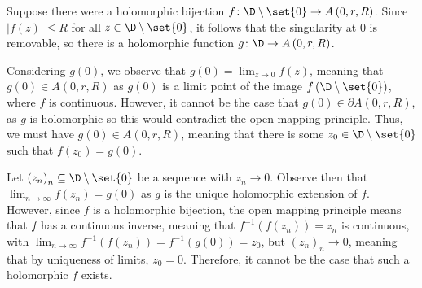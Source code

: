 \documentclass[11pt]{mypackage}
\begin{document}
\begin{solution}
  Suppose there were a holomorphic bijection $f\colon \D\setminus \set{0}\rightarrow A\left( 0,r,R \right)$. Since $\left\vert f(z) \right\vert \leq R$ for all $z\in \D\setminus \set{0}$, it follows that the singularity at $0$ is removable, so there is a holomorphic function $g\colon \D\rightarrow A\left( 0,r,R \right)$.\newline

  Considering $g(0)$, we observe that $g(0) = \lim_{z\rightarrow 0}f(z)$, meaning that $g(0)\in \overline{A}\left( 0,r,R \right)$ as $g(0)$ is a limit point of the image $f\left( \D\setminus \set{0} \right)$, where $f$ is continuous. However, it cannot be the case that $g(0)\in \partial A\left( 0,r,R \right)$, as $g$ is holomorphic so this would contradict the open mapping principle. Thus, we must have $g(0)\in A\left( 0,r,R \right)$, meaning that there is some $z_0\in \D\setminus \set{0}$ such that $f\left(z_0\right) = g(0)$.\newline

  Let $\left( z_n \right)_n\subseteq \D\setminus \set{0}$ be a sequence with $z_n\rightarrow 0$. Observe then that $\lim_{n\rightarrow\infty}f\left( z_n \right) = g\left(0\right)$ as $g$ is the unique holomorphic extension of $f$. However, since $f$ is a holomorphic bijection, the open mapping principle means that $f$ has a continuous inverse, meaning that $f^{-1}\left( f\left( z_n \right) \right) = z_n$ is continuous, with $\lim_{n\rightarrow\infty}f^{-1}\left( f\left( z_n \right) \right) = f^{-1}\left( g(0) \right) = z_0$, but $\left( z_n \right)_n\rightarrow 0$, meaning that by uniqueness of limits, $z_0 = 0$. Therefore, it cannot be the case that such a holomorphic $f$ exists.
\end{solution}
\end{document}
